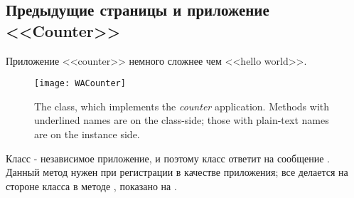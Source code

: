 \documentclass[a4paper,10pt,twoside]{book}
\begin{document}

\subsection{Предыдущие страницы и приложение <<Counter>>}


Приложение <<counter>> немного сложнее чем <<hello world>>.

\begin{figure}[ht]
\begin{center}
\texttt{[image: WACounter]}
\caption{The  class, which implements the \emph{counter} application.
Methods with underlined names are on the class-side; those with plain-text names are on
the instance side.}
\end{center}
\end{figure}


Класс  - независимое приложение, и поэтому класс 
 ответит  на сообщение
.
Данный метод нужен при регистрации в качестве приложения;
все делается на стороне класса в методе , показано на .

\end{document}
